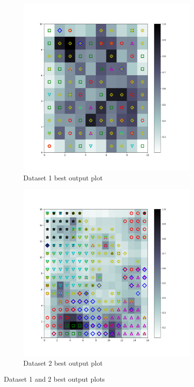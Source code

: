 \documentclass[12pt]{report}
\begin{document}
	\begin{figure}[H]
		\centering
		\begin{subfigure}{.5\textwidth}
			\centering
			\includegraphics[width=.9\linewidth]{../SOM/Output/Dataset1/Plot|Grid100|sigma0.2|lea0.5|iter10000.png}
			\caption{Dataset 1 best output plot}
			\label{Dataset1BestOutputSOM}
		\end{subfigure}%
		\begin{subfigure}{.5\textwidth}
			\centering
			\includegraphics[width=.9\linewidth]{../SOM/Output/Dataset2/Plot|Grid256|sigma0.7|lea0.2|iter20000.png}
			\caption{Dataset 2 best output plot}
			\label{Dataset2BestOutputSOM}
		\end{subfigure}
		\caption{Dataset 1 and 2 best output plots}
		\label{Dataset1And2BestOutputSOM}
	\end{figure}
	\newpage
\end{document}
